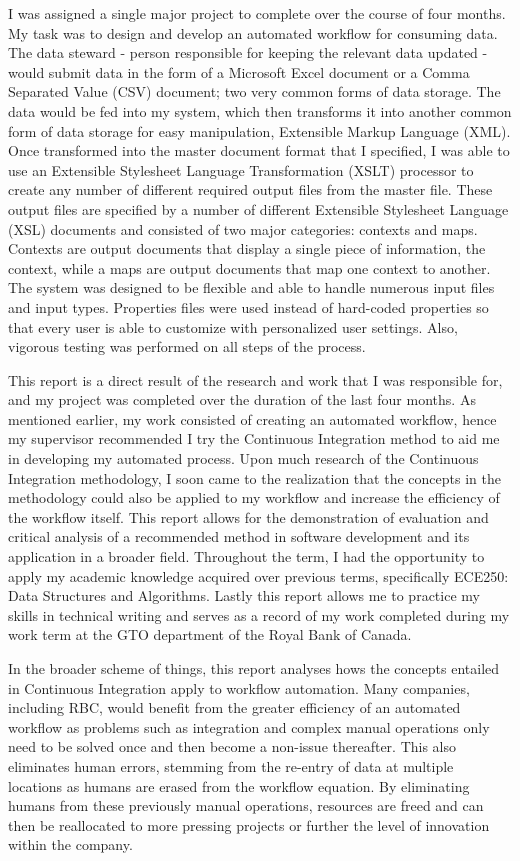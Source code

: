 I was assigned a single major project to complete over the course of four months.  My task was to design and develop an automated workflow for consuming data. The data steward  - person responsible for keeping the relevant data updated - would submit data in the form of a Microsoft Excel document or a Comma Separated Value (CSV) document; two very common forms of data storage. The data would be fed into my system, which then transforms it into another common form of data storage for easy manipulation, Extensible Markup Language (XML).  Once transformed into the master document format that I specified, I was able to use an Extensible Stylesheet Language Transformation (XSLT) processor to create any number of different required output files from the master file. These output files are specified by a number of different Extensible Stylesheet Language (XSL) documents and consisted of two major categories: contexts and maps. Contexts are output documents that display a single piece of information, the context, while a maps are output documents that map one context to another. The system was designed to be flexible and able to handle numerous input files and input types. Properties files were used instead of hard-coded properties so that every user is able to customize with personalized user settings. Also, vigorous testing was performed on all steps of the process.\newline

This report is a direct result of the research and work that I was responsible for, and my project was completed over the duration of the last four months. As mentioned earlier, my work consisted of creating an automated workflow, hence my supervisor recommended I try the Continuous Integration method to aid me in developing my automated process. Upon much research of the Continuous Integration methodology, I soon came to the realization that the concepts in the methodology could also be applied to my workflow and increase the efficiency of the workflow itself. This report allows for the demonstration of evaluation and critical analysis of a recommended method in software development and its application in a broader field. Throughout the term, I had the opportunity to apply my academic knowledge acquired over previous terms, specifically ECE250: Data Structures and Algorithms. Lastly this report allows me to practice my skills in technical writing and serves as a record of my work completed during my work term at the GTO department of the Royal Bank of Canada.\newline

In the broader scheme of things, this report analyses hows the concepts entailed in Continuous Integration apply to workflow automation.  Many companies, including RBC, would benefit from the greater efficiency of an automated workflow as problems such as integration and complex manual operations only need to be solved once and then become a non-issue thereafter.  This also eliminates human errors, stemming from the re-entry of data at multiple locations as humans are erased from the workflow equation. By eliminating humans from these previously manual operations, resources are freed and can then be reallocated to more pressing projects or further the level of innovation within the company.
